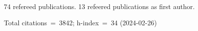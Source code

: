 74 refereed publications. 13 refeered publications as first author.

Total citations~=~3842; h-index~=~34 (2024-02-26)
